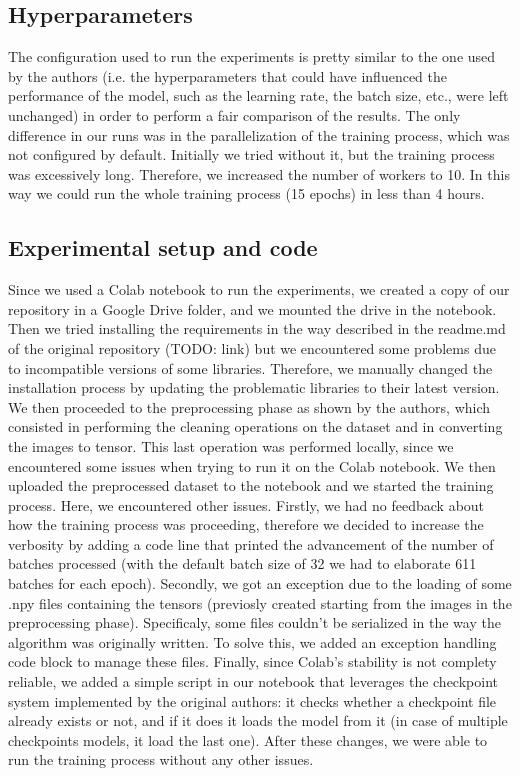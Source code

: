 \subsection{Hyperparameters}
The configuration used to run the experiments is pretty similar to the one used by the authors (i.e. the hyperparameters that could have influenced the performance of the model, such as the learning rate, the batch size, etc., were left unchanged) in order to perform a fair comparison of the results. The only difference in our runs was in the parallelization of the training process, which was not configured by default. Initially we tried without it, but the training process was excessively long. Therefore, we increased the number of workers to 10. In this way we could run the whole training process (15 epochs) in less than 4 hours. 

\subsection{Experimental setup and code}
Since we used a Colab notebook to run the experiments, we created a copy of our repository in a Google Drive folder, and we mounted the drive in the notebook. Then we tried installing the requirements in the way described in the readme.md of the original repository (TODO: link) but we encountered some problems due to incompatible versions of some libraries. Therefore, we manually changed the installation process by updating the problematic libraries to their latest version.
We then proceeded to the preprocessing phase as shown by the authors, which consisted in performing the cleaning operations on the dataset and in converting the images to tensor. This last operation was performed locally, since we encountered some issues when trying to run it on the Colab notebook. We then uploaded the preprocessed dataset to the notebook and we started the training process. Here, we encountered other issues. Firstly, we had no feedback about how the training process was proceeding, therefore we decided to increase the verbosity by adding a code line that printed the advancement of the number of batches processed (with the default batch size of 32 we had to elaborate 611 batches for each epoch). Secondly, we got an exception due to the loading of some .npy files containing the tensors (previosly created starting from the images in the preprocessing phase). Specificaly, some files couldn't be serialized in the way the algorithm was originally written. To solve this, we added an exception handling code block to manage these files. Finally, since Colab's stability is not complety reliable, we added a simple script in our notebook that leverages the checkpoint system implemented by the original authors: it checks whether a checkpoint file already exists or not, and if it does it loads the model from it (in case of multiple checkpoints models, it load the last one).
After these changes, we were able to run the training process without any other issues.



